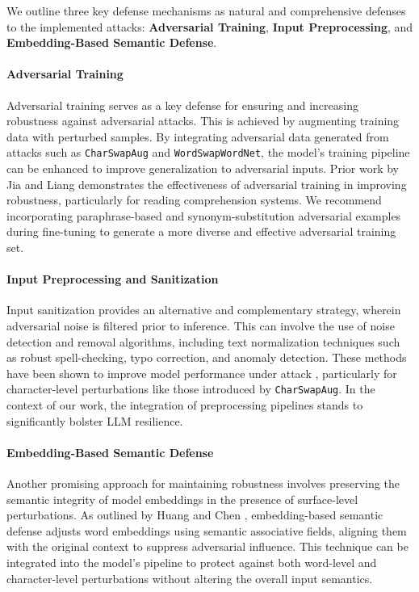 \documentclass[conference]{IEEEtran}
\begin{document}
We outline three key defense mechanisms as natural and comprehensive defenses to the implemented attacks: \textbf{Adversarial Training}, \textbf{Input Preprocessing}, and \textbf{Embedding-Based Semantic Defense}.

\paragraph{Adversarial Training}
Adversarial training serves as a key defense for ensuring and increasing robustness against adversarial attacks. This is achieved by augmenting training data with perturbed samples. By integrating adversarial data generated from attacks such as \texttt{CharSwapAug} and \texttt{WordSwapWordNet}, the model’s training pipeline can be enhanced to improve generalization to adversarial inputs. Prior work by Jia and Liang \cite{jia2017adversarial} demonstrates the effectiveness of adversarial training in improving robustness, particularly for reading comprehension systems. We recommend incorporating paraphrase-based and synonym-substitution adversarial examples during fine-tuning to generate a more diverse and effective adversarial training set.

\paragraph{Input Preprocessing and Sanitization}
Input sanitization provides an alternative and complementary strategy, wherein adversarial noise is filtered prior to inference. This can involve the use of noise detection and removal algorithms, including text normalization techniques such as robust spell-checking, typo correction, and anomaly detection. These methods have been shown to improve model performance under attack \cite{omar2022robust}, particularly for character-level perturbations like those introduced by \texttt{CharSwapAug}. In the context of our work, the integration of preprocessing pipelines stands to significantly bolster LLM resilience.

\paragraph{Embedding-Based Semantic Defense}
Another promising approach for maintaining robustness involves preserving the semantic integrity of model embeddings in the presence of surface-level perturbations. As outlined by Huang and Chen \cite{huang2024semantic}, embedding-based semantic defense adjusts word embeddings using semantic associative fields, aligning them with the original context to suppress adversarial influence. This technique can be integrated into the model’s pipeline to protect against both word-level and character-level perturbations without altering the overall input semantics.
\end{document}
